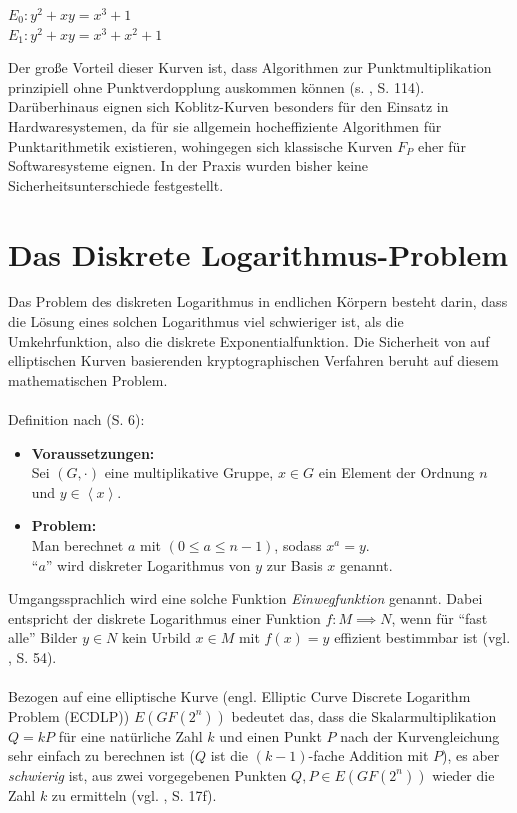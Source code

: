 \begin{center}
$E_0 : y^2 + x y = x^3 + 1 $ \\
$E_1 : y^2 + x y = x^3 + x^2 + 1 $
\end{center}

Der große Vorteil dieser Kurven ist, dass Algorithmen zur Punktmultiplikation prinzipiell ohne Punktverdopplung auskommen können (s. \cite{guide}, S. 114). Darüberhinaus eignen sich Koblitz-Kurven besonders für den Einsatz in Hardwaresystemen, da für sie allgemein hocheffiziente Algorithmen für Punktarithmetik existieren, wohingegen sich klassische Kurven $F_P$ eher für Softwaresysteme eignen. In der Praxis wurden bisher keine Sicherheitsunterschiede festgestellt.

\section{Das Diskrete Logarithmus-Problem} \label{sec:dlp}

Das Problem des diskreten Logarithmus in endlichen Körpern besteht darin, dass die Lösung eines solchen Logarithmus viel schwieriger ist, als die Umkehrfunktion, also die diskrete Exponentialfunktion. Die Sicherheit von auf elliptischen Kurven basierenden kryptographischen Verfahren beruht auf diesem mathematischen Problem. 
\\ \\
Definition nach \cite{baum} (S. 6):
\begin{itemize}
	\item \textbf{Voraussetzungen:}\\
	Sei $(G,\cdot)$ eine multiplikative Gruppe, $x \in G$ ein Element der Ordnung $n$ und $y \in \left \langle x \right \rangle$.
	\item \textbf{Problem:}\\
	Man berechnet $a$ mit $(0 \le a \le n-1)$, sodass $x^a = y$. \\
	``$a$'' wird diskreter Logarithmus von $y$ zur Basis $x$ genannt. \\
\end{itemize}

Umgangssprachlich wird eine solche Funktion \textit{Einwegfunktion} genannt. Dabei entspricht der diskrete Logarithmus einer Funktion $f: M \implies N$, wenn für ``fast alle'' Bilder $y \in N$ kein Urbild $x \in M$ mit $f(x) = y$ effizient bestimmbar ist (vgl. \cite{diskrlog}, S. 54).
\\ \\
Bezogen auf eine elliptische Kurve (engl. Elliptic Curve Discrete Logarithm Problem (ECDLP)) $E(GF(2^n))$ bedeutet das, dass die Skalarmultiplikation $Q = k P$ für eine natürliche Zahl $k$ und einen Punkt $P$ nach der Kurvengleichung sehr einfach zu berechnen ist ($Q$ ist die $(k-1)$-fache Addition mit $P$), es aber \textit{schwierig} ist, aus zwei vorgegebenen Punkten $Q, P \in E(GF(2^n))$ wieder die Zahl $k$ zu ermitteln (vgl. \cite{puttmann}, S. 17f).

